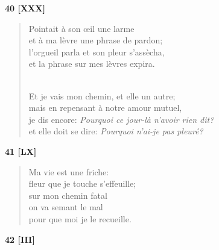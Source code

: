 \documentclass[a4paper,11pt]{book}
\begin{document}
\bigskip

\begin{center} {\bf 40 [XXX]} \end{center}

\begin{verse}
Pointait à son {\oe}il une larme \\
et à ma lèvre une phrase de pardon; \\
l'orgueil parla et son pleur s'assècha, \\
et la phrase sur mes lèvres expira. \\ \

\newpage

Et je vais mon chemin, et elle un autre; \\
mais en repensant à notre amour mutuel, \\
je dis encore: {\em Pourquoi ce jour-là n'avoir rien dit?} \\
et elle doit se dire: {\em Pourquoi n'ai-je pas pleuré?} \\
\end{verse}

\bigskip

\begin{center} {\bf 41 [LX]} \end{center}

\begin{verse}
Ma vie est une friche: \\
fleur que je touche s'effeuille; \\
sur mon chemin fatal \\
on va semant le mal \\
pour que moi je le recueille. \\
\end{verse}

\bigskip

\begin{center} {\bf 42 [III]} \end{center}
\end{document}
